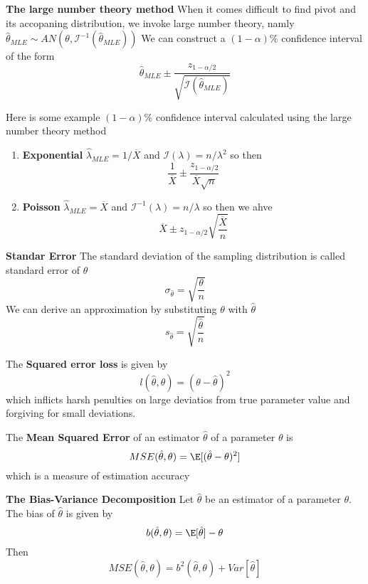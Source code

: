 \documentclass[11pt]{article}
\begin{document}
\begin{defn*}
  \textbf{The large number theory method} When it comes difficult to find pivot and its accopaning distribution, we invoke large number theory, namly $\hat{\theta}_{MLE} \sim AN(\theta, \mathcal{I}^{-1}(\hat{\theta}_{MLE}))$ We can construct a $(1-\alpha)\%$ confidence interval of the form
  \[
    \hat{\theta}_{MLE} \pm \frac{z_{1-\alpha/2 }}{\sqrt{\mathcal{I}(\hat{\theta}_{MLE})}}
  \]
  \begin{rem}
    Here is some example $(1-\alpha)\%$ confidence interval calculated using the large number theory method
    \begin{enumerate}
      \item \textbf{Exponential} $\hat{\lambda}_{MLE} = 1 / \overline{X} $ and $\mathcal{I}(\lambda) = n / \lambda^2$ so then
      \[
        \frac{1}{\overline{X}} \pm \frac{z_{1-\alpha / 2}}{\overline{X} \sqrt{n}}
      \]
      \item \textbf{Poisson} $\hat{\lambda}_{MLE} = \overline{X}$ and $\mathcal{I}^{-1}(\lambda) = n / \lambda$ so then  we ahve
      \[
        \overline{X} \pm z_{1-\alpha / 2} \sqrt{\frac{\overline{X}}{n}}
      \]
    \end{enumerate}
  \end{rem}
\end{defn*}

\begin{defn*}
  \textbf{Standar Error} The standard deviation of the sampling distribution is called standard error of $\theta$
  \[
    \sigma_{\hat{\theta}} = \sqrt{\frac{\theta}{n}}
  \]
  We can derive an approximation by substituting $\theta$ with $\hat{\theta}$
  \[
    s_{ \hat{\theta} } = \sqrt{ \frac{ \hat{\theta}}{n} }
  \]
\end{defn*}

\begin{defn*}
  The \textbf{Squared error loss} is given by
  \[
    l(\hat{\theta}, \theta) = (\theta- \hat{\theta})^2
  \]
  which inflicts harsh penulties on large deviatios from true parameter value and forgiving for small deviations.
\end{defn*}

\begin{defn*}
  The \textbf{Mean Squared Error} of an estimator $\hat{\theta}$ of a parameter $\theta$ is
  \[
    MSE(\hat{\theta}, \theta) = \E[(\hat{\theta}- \theta)^2]
  \]
  which is a measure of estimation accuracy
\end{defn*}


\begin{theorem*}
  \textbf{The Bias-Variance Decomposition} Let $\hat{\theta}$ be an estimator of a parameter $\theta$. The bias of $\hat{\theta}$ is given by
  \[
    b(\hat{\theta}, \theta) = \E[\hat{\theta}] - \theta
  \]
  Then
  \[
    MSE(\hat{\theta}, \theta) = b^2(\hat{\theta}, \theta) + Var[\hat{\theta}]
  \]
\end{theorem*}
\end{document}
